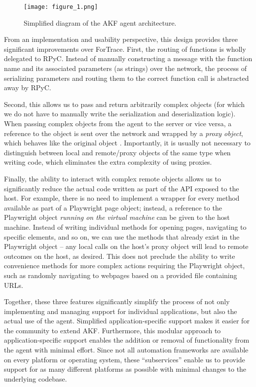 \documentclass[preprint,12pt]{elsarticle}
\begin{document}
\begin{figure*}[htbp]
\centering
\texttt{[image: figure\_1.png]}
\caption{Simplified diagram of the AKF agent
architecture.}\label{fig:figure-1}
\end{figure*}

From an implementation and usability perspective, this design provides
three significant improvements over ForTrace. First, the routing of
functions is wholly delegated to RPyC. Instead of manually constructing
a message with the function name and its associated parameters (as
strings) over the network, the process of serializing parameters and
routing them to the correct function call is abstracted away by RPyC.

Second, this allows us to pass and return arbitrarily complex objects
(for which we do not have to manually write the serialization and
deserialization logic). When passing complex objects from the agent to
the server or vice versa, a reference to the object is sent over the
network and wrapped by a \emph{proxy object}, which behaves like the
original object \citep{TheoryOperationRPyC}. Importantly, it is
usually not necessary to distinguish between local and remote/proxy
objects of the same type when writing code, which eliminates the extra
complexity of using proxies.

Finally, the ability to interact with complex remote objects allows us
to significantly reduce the actual code written as part of the API
exposed to the host. For example, there is no need to implement a
wrapper for every method available as part of a Playwright page object;
instead, a reference to the Playwright object \emph{running on the
virtual machine} can be given to the host machine. Instead of writing
individual methods for opening pages, navigating to specific elements,
and so on, we can use the methods that already exist in the Playwright
object -- any local calls on the host's proxy object will lead to remote
outcomes on the host, as desired. This does not preclude the ability to
write convenience methods for more complex actions requiring the
Playwright object, such as randomly navigating to webpages based on a
provided file containing URLs.

Together, these three features significantly simplify the process of not
only implementing and managing support for individual applications, but
also the actual use of the agent. Simplified application-specific
support makes it easier for the community to extend AKF. Furthermore,
this modular approach to application-specific support enables the
addition or removal of functionality from the agent with minimal effort.
Since not all automation frameworks are available on every platform or
operating system, these ``subservices'' enable us to provide support for
as many different platforms as possible with minimal changes to the
underlying codebase.
\end{document}
